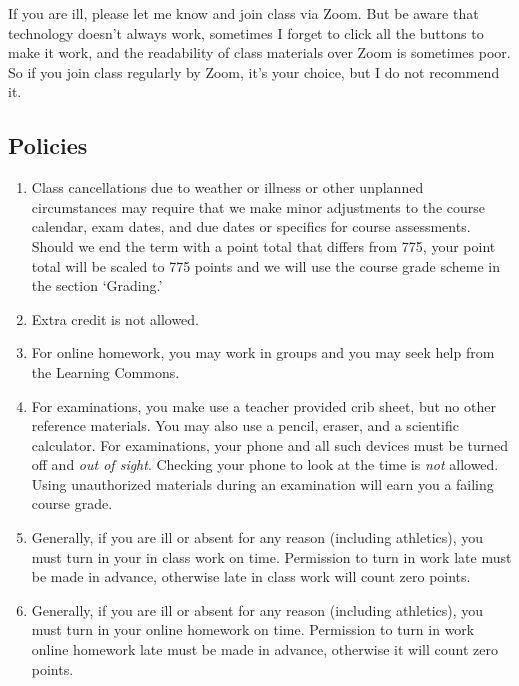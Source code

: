 \documentclass[12pt]{article}
\newcounter{ex}\setcounter{ex}{0}
\begin{document}
If you are ill, please let me know and join class via Zoom. But 
be aware that technology doesn't always work, sometimes I forget to 
click all the buttons to make it work, and the readability of class 
materials over Zoom is sometimes poor. So if you join class regularly 
by Zoom, it's your choice, but I do not recommend it. 

\subsection* {Policies}

\begin{enumerate}

\item Class cancellations due to weather or illness or other 
unplanned circumstances may require that we make minor adjustments
to the course calendar, exam dates, and due dates or specifics for 
course assessments. Should we end the term with a point total that
differs from 775, your point total will be scaled to 775 points and
we will use the course grade scheme in the section `Grading.'

\item Extra credit is not allowed. 

\item For online homework, you may work in groups and you may 
seek help from the Learning Commons. 

\item For examinations, you make use a teacher provided crib sheet, 
but no other reference materials. You may also use a pencil, eraser, 
and a scientific calculator. For examinations, your phone and all such
devices must be turned off and \emph{out of sight}. Checking your phone
to look at the time is \emph{not} allowed. Using unauthorized 
materials during an examination will earn you a failing course grade.

\item Generally, if you are ill or absent for any reason (including 
athletics), you must turn in your in class work on time. Permission to
turn in work late must be made in advance, otherwise late in class work 
will count zero points.

\item Generally,  if you are ill or absent for any reason (including 
athletics), you must turn in your online homework on time. Permission to
turn in work online homework late must be made in advance, otherwise it will
count zero points.
 


\end{enumerate}
\end{document}

